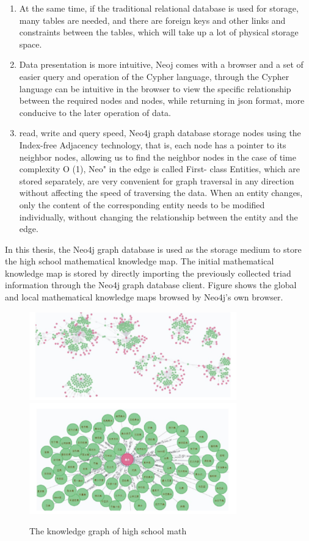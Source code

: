 \documentclass[11pt,en]{elegantpaper}
\begin{document}
\begin{enumerate}
	\item At the same time, if the traditional relational database is used for storage, many tables are needed, and there are foreign keys and other links and constraints between the tables, which will take up a lot of physical storage space.
	\item Data presentation is more intuitive, Neoj comes with a browser and a set of easier query and operation of the Cypher language, through the Cypher language can be intuitive in the browser to view the specific relationship between the required nodes and nodes, while returning in json format, more conducive to the later operation of data.
	\item read, write and query speed, Neo4j graph database storage nodes using the Index-free Adjacency technology, that is, each node has a pointer to its neighbor nodes, allowing us to find the neighbor nodes in the case of time complexity O (1), Neo" in the edge is called First- class Entities, which are stored separately, are very convenient for graph traversal in any direction without affecting the speed of traversing the data. When an entity changes, only the content of the corresponding entity needs to be modified individually, without changing the relationship between the entity and the edge.
\end{enumerate}
In this thesis, the Neo4j graph database is used as the storage medium to store the high school mathematical knowledge map. The initial mathematical knowledge map is stored by directly importing the previously collected triad information through the Neo4j graph database client. Figure \cite{kg3} shows the global and local mathematical knowledge maps browsed by Neo4j's own browser. 

\begin{figure}[h]
	\centering

	\includegraphics[width=0.8\textwidth]{./image/kg3.png}
	\includegraphics[width=0.8\textwidth]{./image/kg4.png}
	\caption{The knowledge graph of high school math}
	\label{kg3}
\end{figure}
\end{document}
